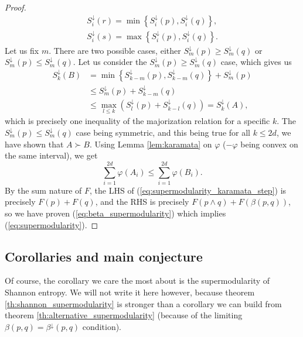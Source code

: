 \begin{proof}
    \begin{gather}
        S^\downarrow_i (r) = \min \left\{S^\downarrow_i (p), S^\downarrow_i (q)\right\}, \\
        S^\downarrow_i (s) = \max \left\{S^\downarrow_i (p), S^\downarrow_i (q)\right\}.
    \end{gather} 
    Let us fix $m$. There are two possible cases, either $S^\downarrow_m (p) \geq S^\downarrow_m (q)$ or $S^\downarrow_m (p) \leq S^\downarrow_m (q)$. Let us consider the $S^\downarrow_m (p) \geq S^\downarrow_m (q)$ case, which gives us
    \begin{align}
        S^\downarrow_k (B) &= \min \left\{S^\downarrow_{k-m} (p), S^\downarrow_{k-m} (q)\right\} + S^\downarrow_m (p) \\
        &\leq S^\downarrow_m (p) + S^\downarrow_{k-m} (q) \\
        &\leq \max_{l\leq k} \left(S^\downarrow_l (p) +S^\downarrow_{k-l} (q)\right) = S^\downarrow_k (A),
    \end{align}
    which is precisely one inequality of the majorization relation for a specific $k$. The $S^\downarrow_m (p) \leq S^\downarrow_m (q)$ case being symmetric, and this being true for all $k \leq 2d$, we have shown that $A \succ B$.
    Using Lemma \ref{lem:karamata} on $\varphi$ ($-\varphi$ being convex on the same interval), we get
    \begin{equation} \label{eq:supermodularity_karamata_step}
        \sum_{i=1}^{2d} \varphi(A_i) \leq \sum_{i=1}^{2d} \varphi(B_i).
    \end{equation}
    By the sum nature of $F$, the LHS of (\ref{eq:supermodularity_karamata_step}) is precisely $F(p) + F(q)$, and the RHS is precisely $F(p \wedge q) + F(\beta(p, q))$, so we have proven (\ref{eq:beta_supermodularity}) which implies (\ref{eq:supermodularity}). \qedhere
\end{proof}

\subsection{Corollaries and main conjecture}

Of course, the corollary we care the most about is the supermodularity of Shannon entropy. We will not write it here however, because theorem \ref{th:shannon_supermodularity} is stronger than a corollary we can build from theorem \ref{th:alternative_supermodularity} (because of the limiting $\beta(p, q) = \beta^\downarrow(p, q)$ condition).

